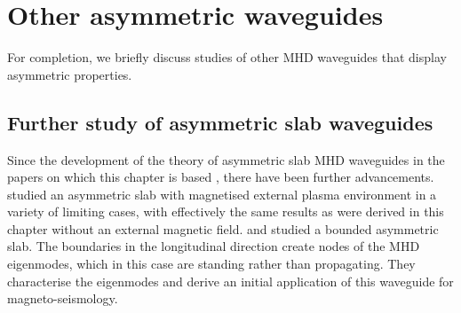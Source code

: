 \section{Other asymmetric waveguides}
\label{sec: other waveguides}

For completion, we briefly discuss studies of other MHD waveguides that display asymmetric properties.

\subsection{Further study of asymmetric slab waveguides}
Since the development of the theory of asymmetric slab MHD waveguides in the papers on which this chapter is based \citep{all_etal17,zsa_etal18}, there have been further advancements. \cite{zsa_etal20} studied an asymmetric slab with magnetised external plasma environment in a variety of limiting cases, with effectively the same results as were derived in this chapter without an external magnetic field. \cite{oxl_etal20a} and \cite{oxl_etal20b} studied a bounded asymmetric slab. The boundaries in the longitudinal direction create nodes of the MHD eigenmodes, which in this case are standing rather than propagating. They characterise the eigenmodes and derive an initial application of this waveguide for magneto-seismology.


